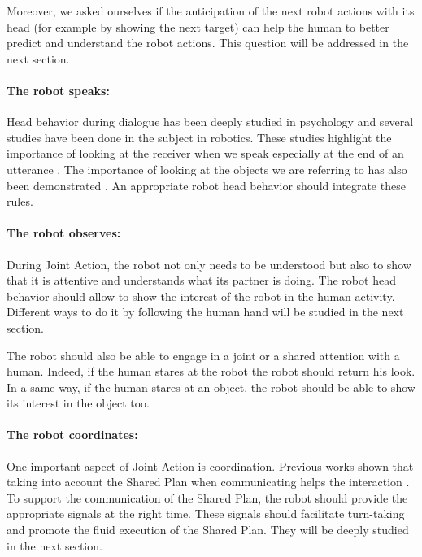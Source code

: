 \documentclass[english,a4paper,11pt,twoside]{StyleThese}
\begin{document}
Moreover, we asked ourselves if the anticipation of the next robot actions with its head (for example by showing the next target) can help the human to better predict and understand the robot actions.
This question will be addressed in the next section.

\paragraph{The robot speaks:}

Head behavior during dialogue has been deeply studied in psychology and several studies have been done in the subject in robotics. These studies highlight the importance of looking at the receiver when we speak especially at the end of an utterance \cite{boucher2010facilitative, skantze2014turn}. The importance of looking at the objects we are referring to has also been demonstrated \cite{mutlu2009footing, staudte2011investigating}. An appropriate robot head behavior should integrate these rules.

\paragraph{The robot observes:}
During Joint Action, the robot not only needs to be understood but also to show that it is attentive and understands what its partner is doing. The robot head behavior should allow to show the interest of the robot in the human activity. Different ways to do it by following the human hand will be studied in the next section. 

The robot should also be able to engage in a joint or a shared attention with a human. Indeed, if the human stares at the robot the robot should return his look. In a same way, if the human stares at an object, the robot should be able to show its interest in the object too.

\paragraph{The robot coordinates:}

One important aspect of Joint Action is coordination. Previous works shown that taking into account the Shared Plan when communicating helps the interaction \cite{lallee2013cooperative}. To support the communication of the Shared Plan, the robot should provide the appropriate signals at the right time. These signals should facilitate turn-taking and promote the fluid execution of the Shared Plan. They will be deeply studied in the next section.
\end{document}
